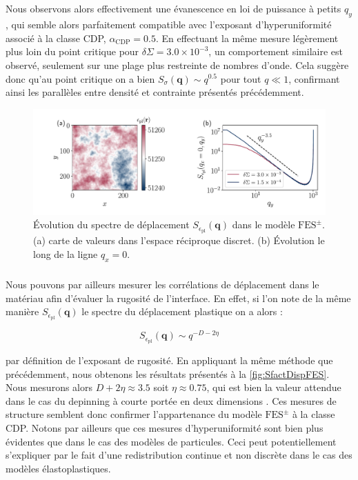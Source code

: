 \subparagraph{}Nous observons alors effectivement une évanescence en loi de puissance à petits $q_y$, qui semble alors parfaitement compatible avec l'exposant d'hyperuniformité associé à la classe CDP, $\alpha_\text{CDP} = 0.5$. En effectuant la même mesure légèrement plus loin du point critique pour $\delta\Sigma = 3.0\times 10^{-3}$, un comportement similaire est observé, seulement sur une plage plus restreinte de nombres d'onde. Cela suggère donc qu'au point critique on a bien $S_\sigma(\mathbf{q})\sim q^{0.5}$ pour tout $q\ll 1$, confirmant ainsi les parallèles entre densité et contrainte présentés précédemment.

\begin{figure}[h]
	\centering	\includegraphics[width=\textwidth]{Chapitre4/Figures/Correlations/Sfact_Disp_SRPNC.pdf}
	\caption{Évolution du spectre de déplacement $S_{\epsilon_\text{pl}}(\mathbf{q})$ dans le modèle $\text{FES}^\pm$. (a) carte de valeurs dans l'espace réciproque discret. (b) Évolution le long de la ligne $q_x=0$.}
	\label{fig:SfactDispFES}
\end{figure}

\subparagraph{}Nous pouvons par ailleurs mesurer les corrélations de déplacement dans le matériau afin d'évaluer la rugosité de l'interface. En effet, si l'on note de la même manière $S_{\epsilon_\text{pl}}(\mathbf{q})$ le spectre du déplacement plastique on a alors :

\begin{equation}
	S_{\epsilon_\text{pl}}(\mathbf{q}) \sim q^{-D-2\eta}
\end{equation}

\noindent par définition de l'exposant de rugosité. En appliquant la même méthode que précédemment, nous obtenons les résultats présentés à la \autoref{fig:SfactDispFES}. Nous mesurons alors $D+2\eta \approx 3.5$ soit $\eta\approx 0.75$, qui est bien la valeur attendue dans le cas du depinning à courte portée en deux dimensions \cite{semeikin_roughness_2024}. Ces mesures de structure semblent donc confirmer l'appartenance du modèle $\text{FES}^\pm$ à la classe CDP. Notons par ailleurs que ces mesures d'hyperuniformité sont bien plus évidentes que dans le cas des modèles de particules. Ceci peut potentiellement s'expliquer par le fait d'une redistribution continue et non discrète dans le cas des modèles élastoplastiques.

